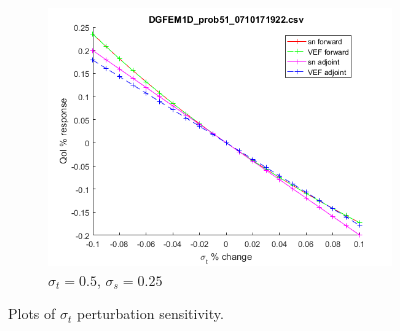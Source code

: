 \documentclass{article}
\newcommand{\sigt}{\sigma_t}
\newcommand{\sigs}{\sigma_s}
\begin{document}
\begin{figure}[H]
\begin{subfigure}{.5\textwidth}
  \includegraphics[width=.8\linewidth]{figures/51sigtSens.png}
  \caption{$\sigt=0.5$, $\sigs=0.25$}
  \label{fig:sfig3}
\end{subfigure}
\caption{Plots of $\sigt$ perturbation sensitivity.}
\label{fig:fig}
\end{figure}
\end{document}
